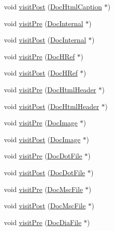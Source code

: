 \begin{DoxyCompactItemize}
void \hyperlink{class_docbook_doc_visitor_ab9cab2d743e9f7dbfbcf2cfc9a192c91}{visit\+Post} (\hyperlink{class_doc_html_caption}{Doc\+Html\+Caption} $\ast$)
\item 
void \hyperlink{class_docbook_doc_visitor_a9e26ec2a4599725869f69c3d20be80b8}{visit\+Pre} (\hyperlink{class_doc_internal}{Doc\+Internal} $\ast$)
\item 
void \hyperlink{class_docbook_doc_visitor_a1be5573f32e80d5c14d57a6abb0e688e}{visit\+Post} (\hyperlink{class_doc_internal}{Doc\+Internal} $\ast$)
\item 
void \hyperlink{class_docbook_doc_visitor_a542ea60585c240618babf24389dd5327}{visit\+Pre} (\hyperlink{class_doc_h_ref}{Doc\+H\+Ref} $\ast$)
\item 
void \hyperlink{class_docbook_doc_visitor_aa8aa2fb1fffb5673634321432d47ffc1}{visit\+Post} (\hyperlink{class_doc_h_ref}{Doc\+H\+Ref} $\ast$)
\item 
void \hyperlink{class_docbook_doc_visitor_a1edc5c55a863a7c952886e21339b6d26}{visit\+Pre} (\hyperlink{class_doc_html_header}{Doc\+Html\+Header} $\ast$)
\item 
void \hyperlink{class_docbook_doc_visitor_aa5b7538c8b75775a1b73ffc35d7f5777}{visit\+Post} (\hyperlink{class_doc_html_header}{Doc\+Html\+Header} $\ast$)
\item 
void \hyperlink{class_docbook_doc_visitor_a0e15a0d2b08248bc0449a1a69c97ef7e}{visit\+Pre} (\hyperlink{class_doc_image}{Doc\+Image} $\ast$)
\item 
void \hyperlink{class_docbook_doc_visitor_aaa86d21cadc355bf8f3b4a6084da25ba}{visit\+Post} (\hyperlink{class_doc_image}{Doc\+Image} $\ast$)
\item 
void \hyperlink{class_docbook_doc_visitor_a61c3c96e6a23be961c52b258bbe6b675}{visit\+Pre} (\hyperlink{class_doc_dot_file}{Doc\+Dot\+File} $\ast$)
\item 
void \hyperlink{class_docbook_doc_visitor_a678e346cfb17e18f3254ecaf05913f46}{visit\+Post} (\hyperlink{class_doc_dot_file}{Doc\+Dot\+File} $\ast$)
\item 
void \hyperlink{class_docbook_doc_visitor_a140c346853a8f3da57bc02cde6055c35}{visit\+Pre} (\hyperlink{class_doc_msc_file}{Doc\+Msc\+File} $\ast$)
\item 
void \hyperlink{class_docbook_doc_visitor_a6cc94b918cbe224dbda6596b56785926}{visit\+Post} (\hyperlink{class_doc_msc_file}{Doc\+Msc\+File} $\ast$)
\item 
void \hyperlink{class_docbook_doc_visitor_ad65e639b1f04504c80255d9dc2a6fe96}{visit\+Pre} (\hyperlink{class_doc_dia_file}{Doc\+Dia\+File} $\ast$)

\end{DoxyCompactItemize}
